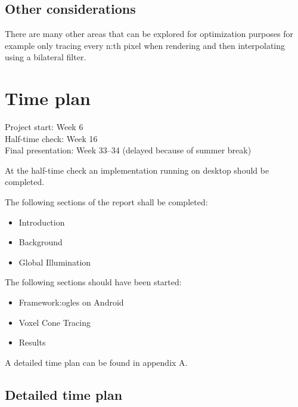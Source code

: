 \documentclass[a4paper, 12pt]{article}
\begin{document}
\subsection{Other considerations}

There are many other areas that can be explored for optimization purposes for example only tracing every n:th pixel when rendering and then interpolating using a bilateral filter. 

\section{Time plan}
\label{sec:Time plan}

Project start: Week 6 \\
Half-time check: Week 16 \\
Final presentation: Week 33--34 (delayed because of summer break)

At the half-time check an implementation running on desktop should be completed.

The following sections of the report shall be completed:
\begin{itemize}
  \item Introduction
  \item Background
  \item Global Illumination
\end{itemize}

The following sections should have been started:
\begin{itemize}
  \item Framework:\@ \gls{ogles} on Android
  \item Voxel Cone Tracing
  \item Results
\end{itemize}

A detailed time plan can be found in appendix A\@.

\begin{refsection}
\nocite{*}
\printbibliography[heading=bibnumbered, title={Literature Base}, subtype=litbase, prefixnumbers={LB}]
\end{refsection}

\printbibliography[heading=bibnumbered, notsubtype=litbase]

\newpage

\begin{appendices}

\section{Detailed time plan}
\label{app:timeplan}



\end{appendices}
\end{document}
